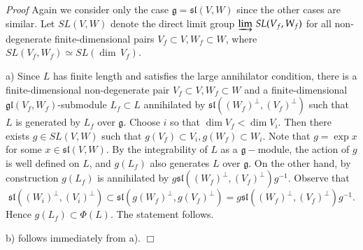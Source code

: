 \documentclass{svmult}
\renewenvironment{proof}{ \emph{Proof}}{$\Box$}
\renewcommand{\sl}{\mathfrak{sl}}
\renewcommand{\gg}{\mathfrak{g}}
\newcommand{\gl}{\mathfrak{gl}}
\begin{document}
\begin{proof} Again we consider only the case $\gg=\sl(V,W)$ 
since the other cases are similar. Let $SL(V,W)$ denote the direct limit group
$\varinjlim\,SL(V_f,W_f)$ for all non-degenerate finite-dimensional
pairs $V_f \subset V, W_f \subset W$, where $SL(V_f,W_f) \simeq SL(\dim\,V_f)$.

a) Since $L$ has finite length and satisfies the large annihilator
condition, there is a finite-dimensional 
non-degenerate pair $V_f\subset V,W_f\subset W$ and a
finite-dimensional $\gl(V_f,W_f)$-submodule 
$L_f \subset L$ annihilated by $\sl((W_f)^\perp,(V_f)^\perp)$ such
that $L$ is generated by $L_f$ over $\gg$. 
Choose $i$ so that $\dim V_f<\dim V_i$. Then there exists $g\in SL(V,W)$ such that
$g(V_f)\subset V_i,g(W_f)\subset W_i$. Note that $g=\exp x$ for some
$x\in \sl(V,W)$.  
By the integrability of $L$ as a $\gg-$module,
the action of $g$ is well defined on $L$, and $g(L_f)$ also generates
$L$ over $\gg$. 
On the other hand, by construction $g(L_f)$ is annihilated by $g\sl((W_f)^\perp,(V_f)^\perp)g^{-1}$.
Observe that
$$\sl((W_i)^\perp,(V_i)^\perp)\subset\sl(g(W_f)^\perp,g(V_f)^\perp)=g\sl((W_f)^\perp,(V_f)^\perp)g^{-1}.$$ 
Hence $g(L_f)\subset\Phi(L)$. The statement follows.

b) follows immediately from a).
\end{proof}
\end{document}
